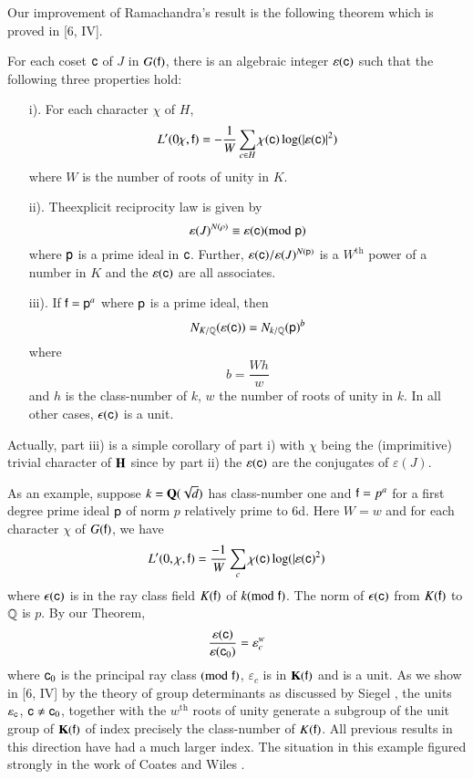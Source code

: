 Our improvement of Ramachandra's result is the following theorem which is proved in [6, IV].

\begin{theorem*}
For each coset $\mathsf{c}$ of $J$ in $G(\mathsf{f})$, there is an algebraic integer $\varepsilon (\mathsf{c})$ such that the following three properties hold:
\begin{itemize}
\item[i).] For each character $\chi$ of $H$,
$$
L' (0 \chi, \mathsf{f}) = - \frac{1}{W} \sum\limits_{c \in H} \chi (\mathsf{c}) \log (|\varepsilon (\mathsf{c})|^2) 
$$
where $W$ is the number of roots of unity in $K$.

\item[ii).] The\pageoriginale explicit reciprocity law is given by
$$
\varepsilon (J)^{N(\rho)} \equiv \varepsilon (\mathsf{c}) ({\rm{mod}}\kern.3em \mathsf{p})
$$
where $\mathsf{p}$ is a prime ideal in $\mathsf{c}$. Further, $\varepsilon (\mathsf{c})/ \varepsilon (J)^{N(\mathsf{p})}$ is a $W^{\text{th}}$ power of a number in $K$ and the $\varepsilon (\mathsf{c})$ are all associates. 

\item[iii).] If $\mathsf{f} = \mathsf{p}^a$ where $\mathsf{p}$ is a prime ideal, then
$$
N_{K/\mathbb{Q}} (\varepsilon (\mathsf{c})) = N_{k/\mathbb{Q}} (\mathsf{p})^b
$$
where 
$$
b = \frac{Wh}{w}
$$
and $h$ is the class-number of $k$, $w$ the number of roots of unity in $k$. In all other cases, $\epsilon (\mathsf{c})$ is a unit. 
\end{itemize}
\end{theorem*}

Actually, part iii) is a simple corollary of part i) with $\chi$ being the (imprimitive) trivial character of $\mathbf{H}$ since by part ii) the  $\varepsilon (\mathsf{c})$ are the conjugates of $\varepsilon (J)$.

As an example, suppose $k = \mathbf{Q} (\sqrt{d})$ has class-number one and $\mathsf{f}=p^a$ for a first degree prime ideal $\mathsf{p}$ of norm $p$ relatively prime to 6d. Here $W = w$ and for each character $\chi$ of $G(\mathsf{f})$, we have 
$$
L' (0, \chi, \mathsf{f}) = \frac{-1}{W} \sum\limits_c \chi (\mathsf{c}) \log (|\varepsilon (\mathsf{c})^2)
$$
where $\epsilon (\mathsf{c})$ is in the ray class field $K(\mathsf{f})$ of $k ({\rm{mod}}\kern.3em \mathsf{f})$. The norm of $\epsilon (\mathsf{c})$ from $K(\mathsf{f})$ to $\mathbb{Q}$ is $p$. By our Theorem,
$$
\frac{\varepsilon (\mathsf{c})}{\varepsilon (\mathsf{c}_0)} = \varepsilon_c^w
$$
where $\mathsf{c}_0$ is the principal ray class $({\rm{mod}}\kern.3em \mathsf{f})$, $\varepsilon_c$ is in $\mathbf{K}(\mathsf{f})$ and is a unit. As we show in [6, IV] by the theory of group determinants as discussed by Siegel \cite{art9-4}, the units $\varepsilon_{\mathsf{c}}$, $\mathsf{c} \neq \mathsf{c}_0$, together with the $w^{\text{th}}$ roots of unity generate a subgroup of the unit group of $\mathbf{K}(\mathsf{f})$ of index precisely the class-number of $K(\mathsf{f})$. All previous results in this direction have had a much larger index. The situation in this example figured strongly in the work of Coates and Wiles \cite{art9-2}.

